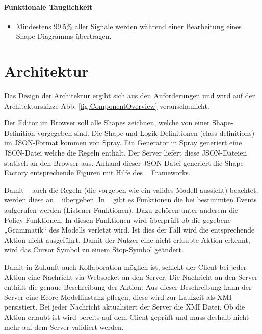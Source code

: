 \paragraph{Funktionale Tauglichkeit}

\begin{itemize}
  \item Mindestens 99.5\% aller Signale werden während einer Bearbeitung eines Shape-Diagramms übertragen.
\end{itemize}



\section{Architektur}

Das Design der Architektur ergibt sich aus den Anforderungen
und wird auf der Architekturskizze Abb. \ref{fig.ComponentOverview}
veranschaulicht.

Der Editor im Browser soll alle Shapes zeichnen,
welche von einer Shape-Definition vorgegeben sind.
Die Shape und Logik-Definitionen (class definitions) im JSON-Format kommen von Spray.
Ein Generator in Spray generiert eine JSON-Datei welche die Regeln enthält.
Der Server liefert diese JSON-Dateien statisch an den Browser aus.
Anhand dieser JSON-Datei generiert die Shape Factory entsprechende Figuren
mit Hilfe des \dd~ Frameworks.

Damit \dd~ auch die Regeln (die vorgeben wie ein valides Modell aussieht) beachtet,
werden diese an \dd~ übergeben.
In \dd~ gibt es Funktionen die bei bestimmten Events aufgerufen werden (Listener-Funktionen). Dazu gehören unter anderem die Policy-Funktionen.
In diesen Funktionen wird überprüft ob die gegebene „Grammatik“ des Modells
verletzt wird. Ist dies der Fall wird die entsprechende Aktion nicht ausgeführt.
Damit der Nutzer eine nicht erlaubte Aktion erkennt,
wird das Cursor Symbol zu einem Stop-Symbol geändert.

Damit in Zukunft auch Kollaboration möglich ist, schickt der Client bei jeder Aktion eine Nachricht via Websocket an den Server.
Die Nachricht an den Server enthält die genaue Beschreibung der Aktion.
Aus dieser Beschreibung kann der Server eine Ecore Modellinstanz pflegen,
diese wird zur Laufzeit als XMI persistiert. Bei jeder Nachricht aktualisiert
der Server die XMI Datei.
Ob die Aktion erlaubt ist wird bereits auf dem Client geprüft und muss deshalb nicht mehr auf dem Server validiert werden.
\\\\

